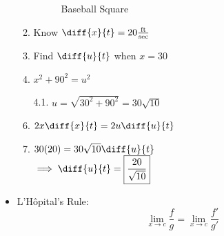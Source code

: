 \documentclass{article}
\begin{document}
\begin{itemize}
\begin{enumerate}
\begin{figure}[h]
            \caption{Baseball Square}
            \label{fig:baseballSquare}
        \end{figure}
        \item Know $\diff{x}{t} = 20 \frac{\text{ft}}{\text{sec}}$
        \item Find $\diff{u}{t}$ when $x = 30$
        \item $x^2 + 90^2 = u^2$
        \item[4.1.] $u = \sqrt{30^2 + 90^2} = 30\sqrt{10}$
        \item $2x\diff{x}{t} = 2u\diff{u}{t}$
        \item $30(20) = 30\sqrt{10}\diff{u}{t}$ \\
        $\implies \diff{u}{t} = \boxed{\frac{20}{\sqrt{10}}}$
    \end{enumerate}
    \item L'H\^{o}pital's Rule:
    \[
    \lim_{x\to c} \frac{f}{g} = \lim_{x\to c} \frac{f'}{g'}
    \]
\end{itemize}

\newpage
\end{document}
